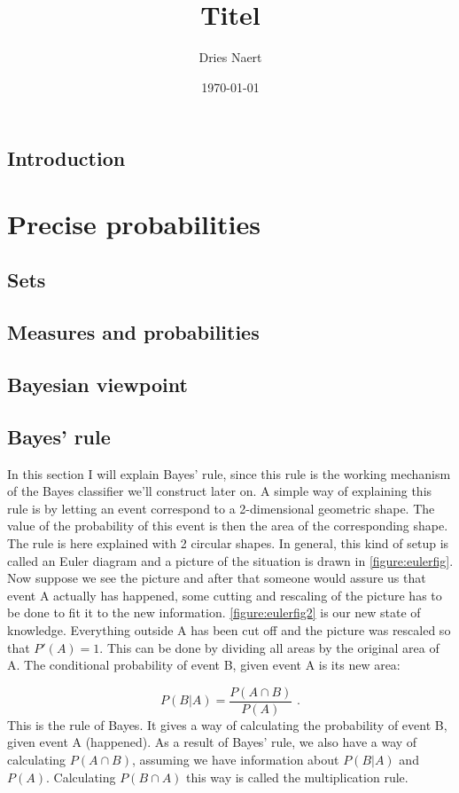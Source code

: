 \documentclass{report}
\title{Titel}
\author{Dries Naert}
\date{\today}
\theoremstyle{definition}
\begin{document}
\maketitle
\tableofcontents
\newpage

\begin{abstract}
\end{abstract}

\section*{Introduction}

\chapter{Precise probabilities}
	\section{Sets}
	\section{Measures and probabilities}
	\section{Bayesian viewpoint}
	\section{Bayes' rule}
	In this section I will explain Bayes' rule, since this rule is the working mechanism of the Bayes classifier we'll construct later on. A simple way of explaining this rule is by letting an event correspond to a 2-dimensional geometric shape. The value of the probability of this event is then the area of the corresponding shape. The rule is here explained with 2 circular shapes. In general, this kind of setup is called an Euler diagram and a picture of the situation is drawn in \ref{figure:eulerfig}. Now suppose we see the picture and after that someone would assure us that event A actually has happened, some cutting and rescaling of the picture has to be done to fit it to the new information. \ref{figure:eulerfig2} is our new state of knowledge. Everything outside A has been cut off and the picture was rescaled so that $P'(A)=1$. This can be done by dividing all areas by the original area of A. The conditional probability of event B, given event A is its new area:
	
	\begin{equation}
	P(B|A) = \frac{P(A \cap B)}{P(A)} \text{ .}
	\end{equation}
	This is the rule of Bayes. It gives a way of calculating the probability of event B, given event A (happened).
	As a result of Bayes' rule, we also have a way of calculating $P(A \cap B)$, assuming we have information about $P(B|A)$ and $P(A)$. Calculating $P(B \cap A)$ this way is called the multiplication rule.\\
	
\end{document}
